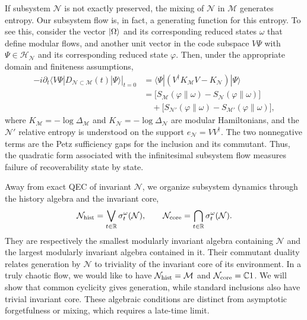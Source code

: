\documentclass[a4paper,11pt]{article}
\theoremstyle{definition}
\newcommand{\mN}{\mathcal{N}}
\newcommand{\mH}{\mathcal{H}}
\newcommand{\mM}{\mathcal{M}}
\begin{document}
If subsystem $\mN$ is not exactly preserved, the mixing of $\mN$ in $\mM$ generates entropy. Our subsystem flow is, in fact, a generating function for this entropy. To see this, consider the vector $\ket{\Omega}$ and its corresponding reduced states $\omega$ that define modular flows, and another unit vector in the code subspace $V\Psi$ with $\Psi\in\mH_{\mN}$ and its corresponding reduced state $\varphi$. Then, under the appropriate domain and finiteness assumptions,
\begin{align}
 -i\left.
 \partial_t
 \langle V\Psi|D_{\mN\subset\mM}(t)|\Psi\rangle
 \right|_{t=0}
 &=
 \langle\Psi|(V^\dagger K_{\mM}V-K_{\mN})|\Psi\rangle
 \nonumber\\
 &=\bigl[S_{\mM}(\varphi\|\omega)-S_{\mN}(\varphi\|\omega)\bigr]
 \nonumber\\
 &\quad+\bigl[S_{\mN'}(\varphi\|\omega)-S_{\mM'}(\varphi\|\omega)\bigr],
 \label{eq:intro-entropy}
\end{align}
where $K_{\mM}=-\log\Delta_{\mM}$ and $K_{\mN}=-\log\Delta_{\mN}$ are modular Hamiltonians, and
 the $\mN'$ relative entropy is understood on the support $e_{\mN}=VV^\dagger$. The two nonnegative terms are the Petz sufficiency gaps for the inclusion and its commutant. Thus, the quadratic form associated with the infinitesimal subsystem flow measures failure of recoverability state by state.

Away from exact QEC of invariant $\mN$, we organize subsystem dynamics through the history algebra and the invariant core,
\begin{equation}
    \mN_{\rm hist}
    =
    \bigvee_{t\in\mathbb R}\sigma_t^\omega(\mN),
    \qquad
    \mN_{\rm core}
    =
    \bigcap_{t\in\mathbb R}\sigma_t^\omega(\mN).\label{eq:intro-core}
\end{equation}
They are respectively the smallest modularly invariant algebra containing $\mN$ and the largest modularly invariant algebra contained in it. Their commutant duality relates generation by $\mN$ to triviality of the invariant core of its environment. In a truly chaotic flow, we would like to have $\mN_{\rm hist}=\mM$ and $\mN_{\rm core}=\mathbb C1$. We will show that common cyclicity gives generation, while standard inclusions also have trivial invariant core. These algebraic conditions are distinct from asymptotic forgetfulness or mixing, which requires a late-time limit.
\end{document}
